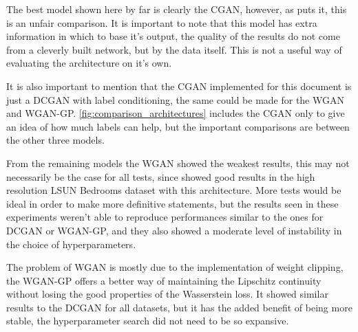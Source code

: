 The best model shown here by far is clearly the \gls{CGAN}, however, as \textcite{nipsGAN2017} puts it, this is an unfair comparison. It is important to note that this model has extra information in which to base it's output, the quality of the results do not come from a cleverly built network, but by the data itself. This is not a useful way of evaluating the architecture on it's own.

It is also important to mention that the \gls{CGAN} implemented for this document is just a \gls{DCGAN} with label conditioning, the same could be made for the \gls{WGAN} and \gls{WGAN-GP}. \autoref{fig:comparison_architectures} includes the \gls{CGAN} only to give an idea of how much labels can help, but the important comparisons are between the other three models.

From the remaining models the \gls{WGAN} showed the weakest results, this may not necessarily be the case for all tests, since \textcite{wasserstein2017} showed good results in the high resolution LSUN Bedrooms dataset with this architecture. More tests would be ideal in order to make more definitive statements, but the results seen in these experiments weren't able to reproduce performances similar to the ones for \gls{DCGAN} or \gls{WGAN-GP}, and they also showed a moderate level of instability in the choice of hyperparameters.

The problem of \gls{WGAN} is mostly due to the implementation of weight clipping, the \gls{WGAN-GP} offers a better way of maintaining the Lipschitz continuity without losing the good properties of the Wasserstein loss. It showed similar results to the \gls{DCGAN} for all datasets, but it has the added benefit of being more stable, the hyperparameter search did not need to be so expansive.
